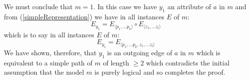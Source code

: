 \documentclass[10pt,a4paper]{article}
\newcommand{\genericmodel}{\mathcal{M}}
\renewcommand{\genericmodel}{{m}}
\begin{document}
We must conclude that $m=1$.
In this case we have $y_1$ an attribute of $a$ in $\genericmodel$ and from (\ref{simpleRepresentation})  we have in all instances $E$ of $\genericmodel$:
\begin{equation}
E_{y_1}=E_{\langle p_1,...p_k \rangle} \circ E_{\langle z_1,...z_l \rangle}
\end{equation}
\noindent which is to say in all instances $E$ of $\genericmodel$:
\begin{equation}
E_{y_1}=E_{\langle p_1,...p_k ,z_1,...z_l \rangle}
\end{equation}
\noindent
We have shown, therefore, that $y_1$ is an outgoing edge of $a$ in $\genericmodel$ 
which is equivalent to a simple path of $\genericmodel$ of length $\geq 2$ which contradicts  the 
 initial assumption that the model $\genericmodel$ is purely logical and so completes the proof.
\end{document}
